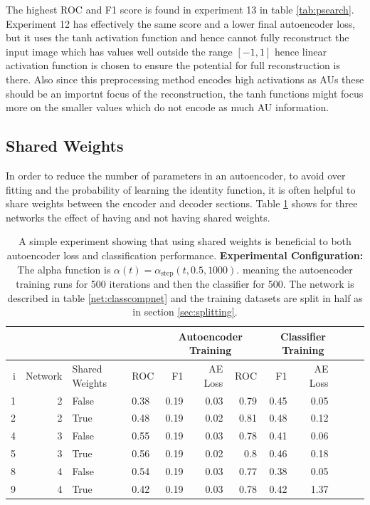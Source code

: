 
      The highest ROC and F1 score is found in experiment 13 in table \ref{tab:psearch}. Experiment 12
      has effectively the same score and a lower final autoencoder loss, but it uses the tanh activation
      function and hence cannot fully reconstruct the input image which has values well outside the
      range $[-1,1]$ hence linear activation function is chosen to ensure the potential for full reconstruction is there.
      Also since this preprocessing method encodes high activations as AUs these should be
      an importnt focus of the reconstruction, the tanh functions might focus more on the smaller values which
      do not encode as much AU information.

    \newpage
    \subsection{Shared Weights}
      In order to reduce the number of parameters in an autoencoder, to avoid over fitting
      and the probability of learning the identity function, it is often helpful to share weights
      between the encoder and decoder sections.
      Table \ref{tab:sharedweights} shows
      for three networks the effect of having and not having shared weights.

      \begin{table}[!h] \centering
      {\footnotesize
      \begin{tabular}{rrllrrrrrrrr}
        &&&&   \multicolumn{3}{|c|}{Autoencoder Training} &  \multicolumn{3}{c|}{Classifier Training}    \\
      \hline
        i & Network               &   Shared Weights &    ROC&F1&AE Loss & ROC & F1 & AE Loss \\
      \hline
       1 & 2    & False     &    0.38 &   0.19 &     0.03 &    0.79 &   0.45 &     0.05 \\
       2 & 2    & True      &    0.48 &   0.19 &     0.02 &    0.81 &   0.48 &     0.12 \\
      \hline
      4 & 3    & False     &    0.55 &   0.19 &     0.03 &    0.78 &   0.41 &     0.06 \\
      5 & 3    & True      &    0.56 &   0.19 &     0.02 &    0.8  &   0.46 &     0.18 \\
      \hline
      8 & 4     & False     &    0.54 &   0.19 &     0.03 &    0.77 &   0.38 &     0.05 \\
      9 & 4     & True      &    0.42 &   0.19 &     0.03 &    0.78 &   0.42 &     1.37 \\
       \hline
     \end{tabular}}\caption{A simple experiment showing that using shared weights is beneficial
     to both autoencoder loss and classification performance. {\bf Experimental Configuration:}
      The alpha function is $\alpha(t)=\alpha_{\text{step}}(t,0.5,1000)$.
      meaning the autoencoder training runs for 500 iterations and then the classifier for 500.
      The network is described in table \ref{net:classcompnet} and the training datasets are split in half as in section
      \ref{sec:splitting}.} \label{tab:sharedweights} \end{table}

